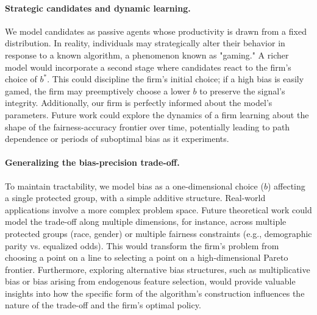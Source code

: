 \paragraph{Strategic candidates and dynamic learning.}
We model candidates as passive agents whose productivity is drawn from a fixed distribution. In reality, individuals may strategically alter their behavior in response to a known algorithm, a phenomenon known as "gaming." A richer model would incorporate a second stage where candidates react to the firm's choice of $b^*$. This could discipline the firm's initial choice; if a high bias is easily gamed, the firm may preemptively choose a lower $b$ to preserve the signal's integrity. Additionally, our firm is perfectly informed about the model's parameters. Future work could explore the dynamics of a firm learning about the shape of the fairness-accuracy frontier over time, potentially leading to path dependence or periods of suboptimal bias as it experiments.

\paragraph{Generalizing the bias-precision trade-off.}
To maintain tractability, we model bias as a one-dimensional choice ($b$) affecting a single protected group, with a simple additive structure. Real-world applications involve a more complex problem space. Future theoretical work could model the trade-off along multiple dimensions, for instance, across multiple protected groups (race, gender) or multiple fairness constraints (e.g., demographic parity vs. equalized odds). This would transform the firm's problem from choosing a point on a line to selecting a point on a high-dimensional Pareto frontier. Furthermore, exploring alternative bias structures, such as multiplicative bias or bias arising from endogenous feature selection, would provide valuable insights into how the specific form of the algorithm's construction influences the nature of the trade-off and the firm's optimal policy.